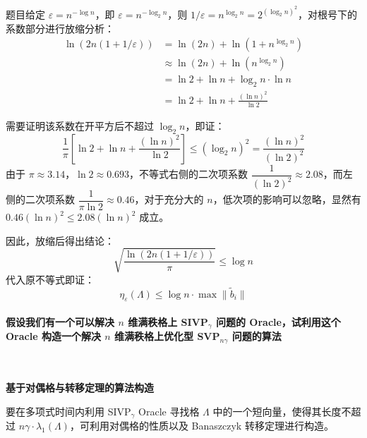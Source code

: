 \documentclass{article}
\begin{document}
题目给定 $\varepsilon = n^{-\log n}$，即 $\varepsilon = n^{-\log_2 n}$，则 $1/\varepsilon = n^{\log_2 n} = 2^{(\log_2 n)^2}$，对根号下的系数部分进行放缩分析：
\begin{align*}
    \ln(2n(1+1/\varepsilon)) &= \ln(2n) + \ln(1 + n^{\log_2 n})
    \\
    &\approx \ln(2n) + \ln(n^{\log_2 n})
    \\
    &= \ln 2 + \ln n + \log_2 n \cdot \ln n
    \\
    &= \ln 2 + \ln n + \frac{(\ln n)^2}{\ln 2}
\end{align*}

需要证明该系数在开平方后不超过 $\log_2 n$，即证：
\[ \frac{1}{\pi} \left[ \ln 2 + \ln n + \frac{(\ln n)^2}{\ln 2} \right] \leqslant (\log_2 n)^2 = \frac{(\ln n)^2}{(\ln 2)^2} \]
由于 $\pi \approx 3.14$，$\ln 2 \approx 0.693$，不等式右侧的二次项系数 $\dfrac{1}{(\ln 2)^2} \approx 2.08$，而左侧的二次项系数 $\dfrac{1}{\pi \ln 2} \approx 0.46$，对于充分大的 $n$，低次项的影响可以忽略，显然有 $0.46 (\ln n)^2 \leqslant 2.08 (\ln n)^2$ 成立。

因此，放缩后得出结论：
\[ \sqrt{\frac{\ln(2n(1+1/\varepsilon))}{\pi}} \leqslant \log n \]
代入原不等式即证：
\[ \eta_\varepsilon(\Lambda) \leqslant \log n \cdot \max \|\tilde{b}_i\| \]



\paragraph*{假设我们有一个可以解决 $n$ 维满秩格上 SIVP$_\gamma$ 问题的 Oracle，试利用这个 Oracle 构造一个解决 $n$ 维满秩格上优化型 SVP$_{n\gamma}$ 问题的算法}~{\\}

\textbf{基于对偶格与转移定理的算法构造}

要在多项式时间内利用 SIVP$_\gamma$ Oracle 寻找格 $\Lambda$ 中的一个短向量，使得其长度不超过 $n\gamma \cdot \lambda_1(\Lambda)$，可利用对偶格的性质以及 Banaszczyk 转移定理进行构造。
\end{document}
